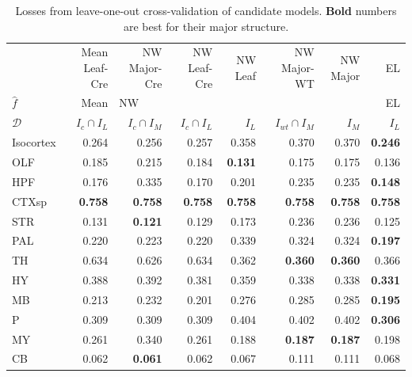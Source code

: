 \begin{table}[H]
\small
\begin{tabular}{lrrrrrrr}
\toprule
& Mean Leaf-Cre & NW Major-Cre& NW Leaf-Cre & NW Leaf &NW Major-WT  & NW Major & EL \\
$\widehat f$ &           Mean & \multicolumn{5}{l}{NW} &     EL \\
$\mathcal D$ & $I_c \cap I_L$ & $I_c \cap I_M$ & $I_c \cap I_L$ & $I_L$ & $I_{wt} \cap I_M$ &  $I_M$ &  $I_L$ \\
\midrule
Isocortex &          0.264 &          0.256 &          0.257 &             0.358 &          0.370 &  0.370 &  \textbf{0.246} \\
OLF       &          0.185 &          0.215 &          0.184 &             \textbf{0.131 }&          0.175 &  0.175 &  0.136 \\
HPF       &          0.176 &          0.335 &          0.170 &             0.201 &          0.235 &  0.235 &  \textbf{0.148} \\
CTXsp     &         \textbf{ 0.758} &          \textbf{0.758} &          \textbf{0.758} &             \textbf{0.758 }&          \textbf{0.758 }&  \textbf{0.758 }&  \textbf{0.758} \\
STR       &          0.131 &         \textbf {0.121} &          0.129 &             0.173 &          0.236 &  0.236 &  0.125 \\
PAL       &          0.220 &          0.223 &          0.220 &             0.339 &          0.324 &  0.324 &  \textbf{0.197} \\
TH        &          0.634 &          0.626 &          0.634 &             0.362 &         \textbf {0.360} &  \textbf{0.360 }&  0.366 \\
HY        &          0.388 &          0.392 &          0.381 &             0.359 &          0.338 &  0.338 &  \textbf{0.331} \\
MB        &          0.213 &          0.232 &          0.201 &             0.276 &          0.285 &  0.285 &  \textbf{0.195} \\
P         &          0.309 &          0.309 &          0.309 &             0.404 &          0.402 &  0.402 &  \textbf{0.306} \\
MY        &          0.261 &          0.340 &          0.261 &             0.188 &         \textbf{ 0.187 }&  \textbf{0.187} &  0.198 \\
CB        &          0.062 &          \textbf{0.061} &          0.062 &             0.067 &          0.111 &  0.111 &  0.068 \\
\bottomrule
\end{tabular}
\caption{Losses from leave-one-out cross-validation of candidate models. \textbf{Bold} numbers are best for their major structure.}
\label{tab:crossvalidation}
\end{table}


